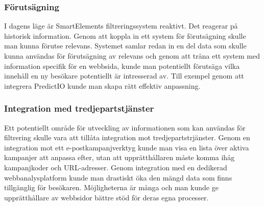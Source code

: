 \subsubsection{Förutsägning}

I dagens läge är SmartElements filtreringssystem reaktivt. Det reagerar på historisk information. Genom att koppla in ett system för förutsägning skulle man kunna förutse relevans. Systemet samlar redan in en del data som skulle kunna användas för förutsägning av relevans och genom att träna ett system med information specifik för en webbsida, kunde man potentiellt förutsäga vilka innehåll en ny besökare potentiellt är intresserad av. Till exempel genom att integrera PredictIO kunde man skapa rätt effektiv anpassning.

\subsubsection{Integration med tredjepartstjänster}

Ett potentiellt område för utveckling av informationen som kan användas för filtrering skulle vara att tillåta integration mot tredjepartstrjänster. Genom en integration mot ett e-postkampanjverktyg kunde man visa en lista över aktiva kampanjer att anpassa efter, utan att upprätthållaren måste komma ihåg kampanjkoder och URL-adresser. Genom integration med en dedikerad webbanalysplatform kunde man drastiskt öka den mängd data som finns tillgänglig för besökaren. Möjligheterna är många och man kunde ge upprätthållare av webbsidor bättre stöd för deras egna processer.



